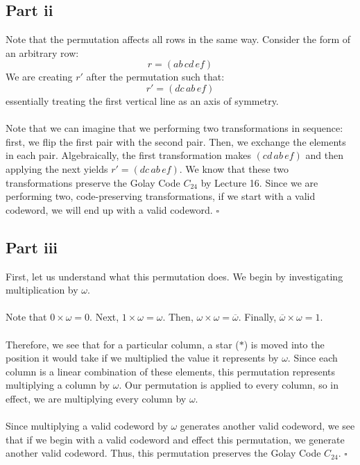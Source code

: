 \documentclass[letterpaper]{article}
\newcommand*{\QED}{\hfill\ensuremath{\square}}%
\begin{document}
\subsection{Part ii}
\label{subs:7Partii}

Note that the permutation affects all rows in the same way.
Consider the form of an arbitrary row:
\[
r = (ab\,cd\,ef)
\]
We are creating $ r' $ after the permutation such that:
\[
r' = (dc\,ab\,ef)
\]
essentially treating the first vertical line as an axis of symmetry.
\\ \\
Note that we can imagine that we performing two transformations in sequence: first, we flip the first pair with the second pair.
Then, we exchange the elements in each pair.
Algebraically, the first transformation makes $ (cd\,ab\,ef) $ and then applying the next yields $ r' = (dc\,ab\,ef) $.
We know that these two transformations preserve the Golay Code $ C_{24} $ by Lecture 16.
Since we are performing two, code-preserving transformations, if we start with a valid codeword, we will end up with a valid codeword.
\QED{}

\subsection{Part iii}
\label{subs:7Partiii}

First, let us understand what this permutation does.
We begin by investigating multiplication by $ \omega $.
\\ \\
Note that $ 0 \times \omega = 0 $.
Next, $ 1 \times \omega = \omega $.
Then, $ \omega \times \omega = \overline{\omega} $.
Finally, $ \overline{\omega} \times \omega = 1 $.
\\ \\
Therefore, we see that for a particular column, a star ($ * $) is moved into the position it would take if we multiplied the value it represents by $ \omega $.
Since each column is a linear combination of these elements, this permutation represents multiplying a column by $ \omega $.
Our permutation is applied to every column, so in effect, we are multiplying every column by $ \omega $.
\\ \\
Since multiplying a valid codeword by $ \omega $ generates another valid codeword, we see that if we begin with a valid codeword and effect this permutation, we generate another valid codeword.
Thus, this permutation preserves the Golay Code $ C_{24} $.
\QED{}
\end{document}
